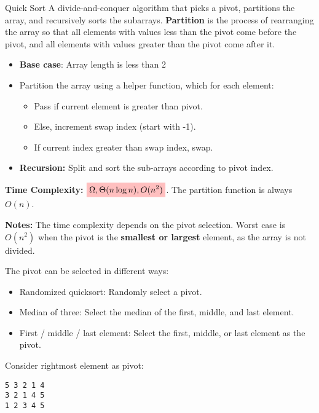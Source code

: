\begin{definition}
    {Quick Sort}
    A divide-and-conquer algorithm that picks a pivot, partitions the array, and recursively sorts the subarrays. \textbf{Partition} is the process of rearranging the array so that all elements with values less than the pivot come before the pivot, and all elements with values greater than the pivot come after it.

    \begin{itemize}
        \item \textbf{Base case}: Array length is less than 2
        \item Partition the array using a helper function, which for each element:
              \begin{itemize}
                  \item Pass if current element is greater than pivot.
                  \item Else, increment swap index (start with -1).
                  \item If current index greater than swap index, swap.
              \end{itemize}
        \item \textbf{Recursion:} Split and sort the sub-arrays according to pivot index.
    \end{itemize}

    \textbf{Time Complexity:} $\mathcolorbox{pink}{\Omega,\Theta(n \log n),O(n^2)}$. The partition function is always $O(n)$.

    \textbf{Notes:} The time complexity depends on the pivot selection. Worst case is $O(n^2)$ when the pivot is the \textbf{smallest or largest} element, as the array is not divided.

    The pivot can be selected in different ways:
    \begin{itemize}
        \item Randomized quicksort: Randomly select a pivot.
        \item Median of three: Select the median of the first, middle, and last element.
        \item First / middle / last element: Select the first, middle, or last element as the pivot.
    \end{itemize}
    \tcblower
    Consider rightmost element as pivot:
    \begin{lstlisting}
5 3 2 1 4
3 2 1 4 5
1 2 3 4 5\end{lstlisting}
\end{definition}

